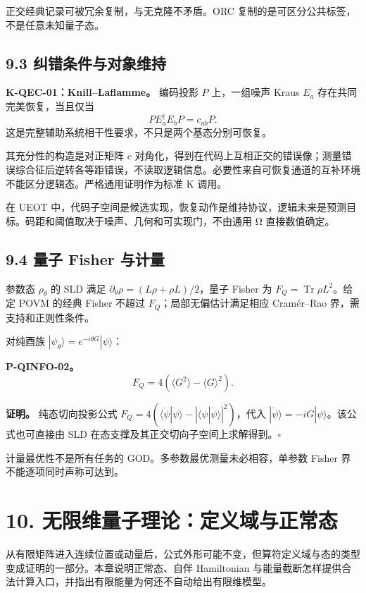 \documentclass[
  11pt,
  oneside]{book}
\begin{document}
正交经典记录可被冗余复制，与无克隆不矛盾。ORC
复制的是可区分公共标签，不是任意未知量子态。

\section{9.3 纠错条件与对象维持}

\textbf{K-QEC-01：Knill--Laflamme。} 编码投影 \(P\) 上，一组噪声 Kraus
\(E_a\) 存在共同完美恢复，当且仅当 \[
PE_a^\dagger E_bP=c_{ab}P.
\] 这是完整辅助系统相干性要求，不只是两个基态分别可恢复。

其充分性的构造是对正矩阵 \(c\)
对角化，得到在代码上互相正交的错误像；测量错误综合征后逆转各等距错误，不读取逻辑信息。必要性来自可恢复通道的互补环境不能区分逻辑态。严格通用证明作为标准
K 调用。

在 UEOT
中，代码子空间是候选实现，恢复动作是维持协议，逻辑未来是预测目标。码距和阈值取决于噪声、几何和可实现门，不由通用
Ω 直接数值确定。

\section{9.4 量子 Fisher 与计量}

参数态 \(\rho_\theta\) 的 SLD 满足
\(\partial_\theta\rho=(L\rho+\rho L)/2\)，量子 Fisher 为
\(F_Q=\operatorname{Tr}\rho L^2\)。给定 POVM 的经典 Fisher 不超过
\(F_Q\)；局部无偏估计满足相应 Cramér--Rao 界，需支持和正则性条件。

对纯酉族 \(|\psi_\theta\rangle=e^{-i\theta G}|\psi\rangle\)：

\protect\hypertarget{p-qinfo-02}{}{}

\textbf{P-QINFO-02。} \[
F_Q=4(\langle G^2\rangle-\langle G\rangle^2).
\]

\textbf{证明。} 纯态切向投影公式
\(F_Q=4(\langle\dot\psi|\dot\psi\rangle- |\langle\psi|\dot\psi\rangle|^2)\)，代入
\(|\dot\psi\rangle=-iG|\psi\rangle\)。该公式也可直接由 SLD
在态支撑及其正交切向子空间上求解得到。\(\square\)

计量最优性不是所有任务的 GOD。多参数最优测量未必相容，单参数 Fisher
界不能逐项同时声称可达到。

\chapter{10. 无限维量子理论：定义域与正常态}\label{ch-10}\hypertarget{ch-10}{}

从有限矩阵进入连续位置或动量后，公式外形可能不变，但算符定义域与态的类型变成证明的一部分。本章说明正常态、自伴
Hamiltonian
与能量截断怎样提供合法计算入口，并指出有限能量为何还不自动给出有限维模型。
\end{document}
